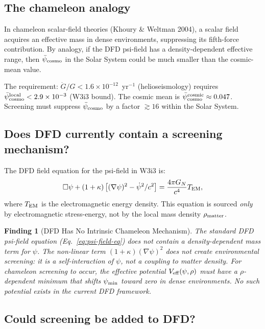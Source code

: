 \documentclass[11pt]{article}
\newtheorem{finding}{Finding}
\newcommand{\ee}[1]{\times 10^{#1}}
\newcommand{\psicosmo}{\bar{\psi}_{\rm cosmo}}
\begin{document}
\subsection{The chameleon analogy}

In chameleon scalar-field theories (Khoury \& Weltman 2004), a scalar field
acquires an effective mass in dense environments, suppressing its fifth-force
contribution. By analogy, if the DFD psi-field has a density-dependent effective
range, then $\psicosmo$ in the Solar System could be much smaller than the
cosmic-mean value.

The requirement: $\dot{G}/G < 1.6\ee{-12}$~yr$^{-1}$ (helioseismology) requires
$\psicosmo^{\rm local} < 2.9\ee{-3}$ (W3i3 bound). The cosmic mean is
$\psicosmo^{\rm cosmic} \approx 0.047$. Screening must suppress
$\psicosmo$ by a factor $\gtrsim 16$ within the Solar System.

\subsection{Does DFD currently contain a screening mechanism?}

The DFD field equation for the psi-field in W3i3 is:
\begin{equation}
\Box\psi + (1+\kappa)\left[(\nabla\psi)^2 - \dot{\psi}^2/c^2\right]
= \frac{4\pi G_N}{c^4} T_{\rm EM},
\label{eq:psi-field-eq}
\end{equation}
where $T_{\rm EM}$ is the electromagnetic energy density. This equation is
sourced \emph{only} by electromagnetic stress-energy, not by the local mass
density $\rho_{\rm matter}$.

\begin{finding}[DFD Has No Intrinsic Chameleon Mechanism]
\label{find:no-chameleon}
The standard DFD psi-field equation (Eq.~\ref{eq:psi-field-eq}) does not
contain a density-dependent mass term for $\psi$. The non-linear term
$(1+\kappa)(\nabla\psi)^2$ does not create environmental screening:
it is a \emph{self-interaction} of $\psi$, not a coupling to matter density.
For chameleon screening to occur, the effective potential $V_{\rm eff}(\psi,\rho)$
must have a $\rho$-dependent minimum that shifts $\psi_{\rm min}$ toward zero
in dense environments. No such potential exists in the current DFD framework.
\end{finding}

\subsection{Could screening be added to DFD?}
\end{document}

